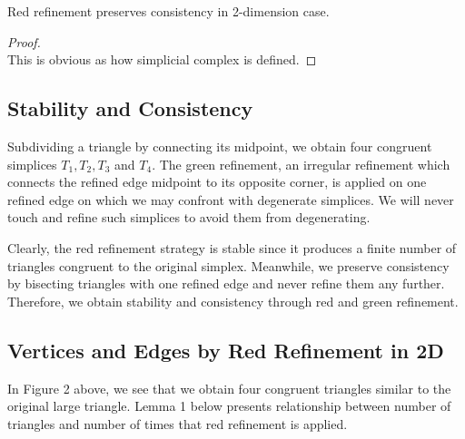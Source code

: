     \begin{lemma*}
    Red refinement preserves consistency in 2-dimension case.
    \end{lemma*}
    \begin{proof}\mbox{}\\
    This is obvious as how simplicial complex is defined.
    \end{proof}

    \subsection{Stability and Consistency}
    Subdividing a triangle by connecting its midpoint, we obtain four congruent simplices $T_1, T_2, T_3$ and $T_4$. The green refinement, an irregular refinement which connects the refined edge midpoint to its opposite corner, is applied on one refined edge on which we may confront with degenerate simplices. We will never touch and refine such simplices to avoid them from degenerating.

    Clearly, the red refinement strategy is stable since it produces a finite number of triangles congruent to the original simplex. Meanwhile, we preserve consistency by bisecting triangles with one refined edge and never refine them any further. Therefore, we obtain stability and consistency through red and green refinement.

    \subsection{Vertices and Edges by Red Refinement in 2D}
    In Figure 2 above, we see that we obtain four congruent triangles similar to the original large triangle. Lemma 1 below presents relationship between number of triangles and number of times that red refinement is applied.

